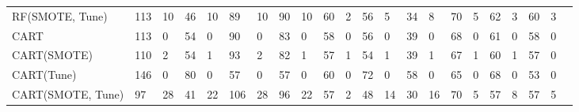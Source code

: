 \documentclass[compsoc, onecolumn]{IEEEtran}
\begin{document}
\begin{table*}[h]
{\begin{tabular}{l@{}|l@{~}l@{~}|l@{~}l@{~}|l@{~}l@{~}|l@{~}l@{~}|l@{~}l@{~}|l@{~}l@{~}|l@{~}l@{~}|l@{~}l@{~}|l@{~}l@{~}|l@{~}l@{~}l@{~}}
RF(SMOTE, Tune) & 113 & 10 & 46 & 10 & 89  & 10 & 90 & 10       & 60 & 2      & 56 & 5       & 34 & 8         & 70 & 5    & 62 & 3    & 60 & 3 \\
CART        & 113 & 0   & 54 & 0  & 90 & 0   & 83 & 0    & 58     & 0    & 56   & 0    & 39    & 0    & 68      & 0    & 61 & 0    & 58 & 0    &   \\
CART(SMOTE) & 110 & 2   & 54 & 1  & 93 & 2   & 82 & 1    & 57     & 1    & 54   & 1    & 39    & 1    & 67      & 1    & 60 & 1    & 57 & 0    &   \\
CART(Tune)  & 146 & 0   & 80 & 0  & 57 & 0   & 57 & 0    & 60     & 0    & 72   & 0    & 58    & 0    & 65      & 0    & 68 & 0    & 53 & 0    &   \\
CART(SMOTE, Tune) & 97  & 28 & 41 & 22 & 106 & 28 & 96 & 22       & 57 & 2      & 48 & 14      & 30 & 16        & 70 & 5    & 57 & 8    & 57 & 5\\ \hline
\end{tabular}}
\end{table*}
\end{document}
